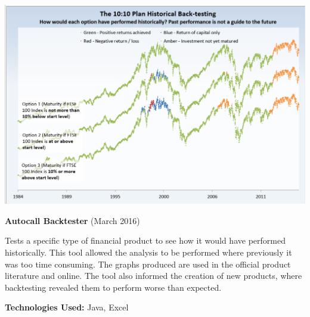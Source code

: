 \documentclass[hidelinks, 12pt, a4paper]{article}
\begin{document}
\begin{minipage}{0.40\textwidth}
		\begin{center}
			\includegraphics[width=0.9\linewidth]{backtest.png}
		\end{center}
		\vspace{-12pt}
		\textbf{Autocall Backtester} (March 2016)
		
		Tests a specific type of financial product to see how it would have performed historically. This tool allowed the analysis to be performed where previously it was too time consuming. The graphs produced are used in the official product literature and online. The tool also informed the creation of new products, where backtesting revealed them to perform worse than expected.
		
		\textbf{Technologies Used:} Java, Excel
	\end{minipage}
	\hspace{0.02\textwidth}
	
	
\end{document}
